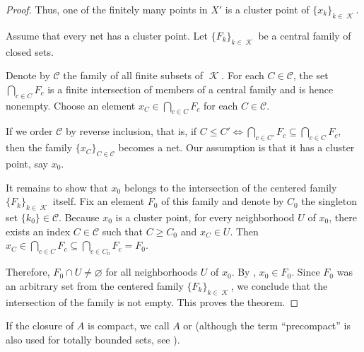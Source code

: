 \begin{proof}
  Thus, one of the finitely many points in \( X' \) is a cluster point of \( \{ x_k \}_{k \in \mscrK} \).

   Assume that every net has a cluster point. Let \( \{ F_k \}_{k \in \mscrK} \) be a central family of closed sets.

  Denote by \( \mathcal C \) the family of all finite subsets of \( \mscrK \). For each \( C \in \mathcal C \), the set \( \bigcap_{c \in C} F_c \) is a finite intersection of members of a central family and is hence nonempty. Choose an element \( x_C \in \bigcap_{c \in C} F_c \) for each \( C \in \mathcal C \).

  If we order \( \mathcal C \) by reverse inclusion, that is, if \( C \leq C' \iff \bigcap_{c \in C'} F_c \subseteq \bigcap_{c \in C} F_c \), then the family \( \{ x_C \}_{C \in \mathcal C} \) becomes a net. Our assumption is that it has a cluster point, say \( x_0 \).

  It remains to show that \( x_0 \) belongs to the intersection of the centered family \( \{ F_k \}_{k \in \mscrK} \) itself. Fix an element \( F_0 \) of this family and denote by \( C_0 \) the singleton set \( \{ k_0 \} \in \mathcal C \). Because \( x_0 \) is a cluster point, for every neighborhood \( U \) of \( x_0 \), there exists an index \( C \in \mathcal C \) such that \( C \geq C_0 \) and \( x_C \in U \). Then \( x_C \in \bigcap_{c \in C} F_c \subseteq \bigcap_{c \in C_0} F_c = F_0 \).

  Therefore, \( F_0 \cap U \neq \varnothing \) for all neighborhoods \( U \) of \( x_0 \). By , \( x_0 \in F_0 \). Since \( F_0 \) was an arbitrary set from the centered family \( \{ F_k \}_{k \in \mscrK} \), we conclude that the intersection of the family is not empty. This proves the theorem.
\end{proof}

\begin{remark}\label{rem:precompact_set}
  If the closure of \( A \) is compact, we call \( A \)  or  (although the term \enquote{precompact} is also used for totally bounded sets, see ).
\end{remark}

